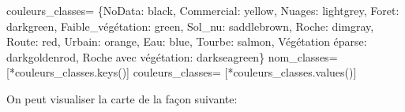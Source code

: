 \documentclass[
]{article}
\newenvironment{Shaded}{}{}
\newcommand{\NormalTok}[1]{#1}
\newcommand{\OperatorTok}[1]{\textcolor[rgb]{0.40,0.40,0.40}{#1}}
\newcommand{\StringTok}[1]{\textcolor[rgb]{0.25,0.44,0.63}{#1}}
\begin{document}
\label{9edc7159}
\label{cb5}
\begin{Shaded}
\begin{Highlighting}[]
\NormalTok{couleurs\_classes}\OperatorTok{=}\NormalTok{ \{}\StringTok{\textquotesingle{}NoData\textquotesingle{}}\NormalTok{: }\StringTok{\textquotesingle{}black\textquotesingle{}}\NormalTok{, }\StringTok{\textquotesingle{}Commercial\textquotesingle{}}\NormalTok{: }\StringTok{\textquotesingle{}yellow\textquotesingle{}}\NormalTok{, }\StringTok{\textquotesingle{}Nuages\textquotesingle{}}\NormalTok{: }\StringTok{\textquotesingle{}lightgrey\textquotesingle{}}\NormalTok{, }
                    \StringTok{\textquotesingle{}Foret\textquotesingle{}}\NormalTok{: }\StringTok{\textquotesingle{}darkgreen\textquotesingle{}}\NormalTok{, }\StringTok{\textquotesingle{}Faible\_végétation\textquotesingle{}}\NormalTok{: }\StringTok{\textquotesingle{}green\textquotesingle{}}\NormalTok{, }\StringTok{\textquotesingle{}Sol\_nu\textquotesingle{}}\NormalTok{: }\StringTok{\textquotesingle{}saddlebrown\textquotesingle{}}\NormalTok{,}
                  \StringTok{\textquotesingle{}Roche\textquotesingle{}}\NormalTok{: }\StringTok{\textquotesingle{}dimgray\textquotesingle{}}\NormalTok{, }\StringTok{\textquotesingle{}Route\textquotesingle{}}\NormalTok{: }\StringTok{\textquotesingle{}red\textquotesingle{}}\NormalTok{, }\StringTok{\textquotesingle{}Urbain\textquotesingle{}}\NormalTok{: }\StringTok{\textquotesingle{}orange\textquotesingle{}}\NormalTok{, }\StringTok{\textquotesingle{}Eau\textquotesingle{}}\NormalTok{: }\StringTok{\textquotesingle{}blue\textquotesingle{}}\NormalTok{, }\StringTok{\textquotesingle{}Tourbe\textquotesingle{}}\NormalTok{: }\StringTok{\textquotesingle{}salmon\textquotesingle{}}\NormalTok{, }\StringTok{\textquotesingle{}Végétation éparse\textquotesingle{}}\NormalTok{: }\StringTok{\textquotesingle{}darkgoldenrod\textquotesingle{}}\NormalTok{, }\StringTok{\textquotesingle{}Roche avec végétation\textquotesingle{}}\NormalTok{: }\StringTok{\textquotesingle{}darkseagreen\textquotesingle{}}\NormalTok{\}}
\NormalTok{nom\_classes}\OperatorTok{=}\NormalTok{ [}\OperatorTok{*}\NormalTok{couleurs\_classes.keys()]}
\NormalTok{couleurs\_classes}\OperatorTok{=}\NormalTok{ [}\OperatorTok{*}\NormalTok{couleurs\_classes.values()]}
\end{Highlighting}
\end{Shaded}

On peut visualiser la carte de la façon suivante:
\end{document}
